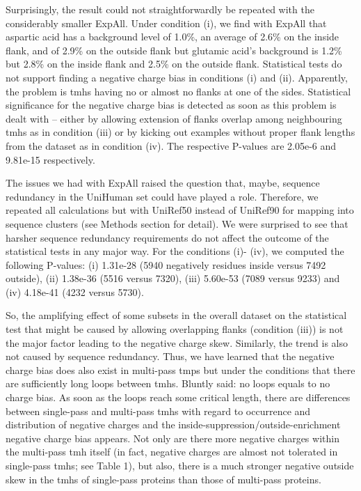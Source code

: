 Surprisingly, the result could not straightforwardly be repeated with the considerably smaller ExpAll. Under condition (i), we find with ExpAll that aspartic acid has a background level of 1.0\%, an average of 2.6\% on the inside flank, and of 2.9\% on the outside flank but glutamic acid’s background is 1.2\% but 2.8\% on the inside flank and 2.5\% on the outside flank. Statistical tests do not support finding a negative charge bias in conditions (i) and (ii). Apparently, the problem is \gls{tmh}s having no or almost no flanks at one of the sides. Statistical significance for the negative charge bias is detected as soon as this problem is dealt with – either by allowing extension of flanks overlap among neighbouring \gls{tmh}s as in condition (iii) or by kicking out examples without proper flank lengths from the dataset as in condition (iv). The respective P-values are 2.05e-6 and 9.81e-15 respectively.

The issues we had with ExpAll raised the question that, maybe, sequence redundancy in the UniHuman set could have played a role. Therefore, we repeated all calculations but with UniRef50 instead of UniRef90 for mapping into sequence clusters (see Methods section for detail). We were surprised to see that harsher sequence redundancy requirements do not affect the outcome of the statistical tests in any major way. For the conditions (i)- (iv), we computed the following P-values: (i) 1.31e-28 (5940 negatively residues inside versus 7492 outside), (ii) 1.38e-36 (5516 versus 7320), (iii) 5.60e-53 (7089 versus 9233) and (iv) 4.18e-41 (4232 versus 5730).

So, the amplifying effect of some subsets in the overall dataset on the statistical test that might be caused by allowing overlapping flanks (condition (iii)) is not the major factor leading to the negative charge skew. Similarly, the trend is also not caused by sequence redundancy. Thus, we have learned that the negative charge bias does also exist in multi-pass \gls{tmp}s but under the conditions that there are sufficiently long loops between \gls{tmh}s. Bluntly said: no loops equals to no charge bias. As soon as the loops reach some critical length, there are differences between single-pass and multi-pass \gls{tmh}s with regard to occurrence and distribution of negative charges and the inside-suppression/outside-enrichment negative charge bias appears. Not only are there more negative charges within the multi-pass \gls{tmh} itself (in fact, negative charges are almost not tolerated in single-pass \gls{tmh}s; see Table 1), but also, there is a much stronger negative outside skew in the \gls{tmh}s of single-pass proteins than those of multi-pass proteins.

